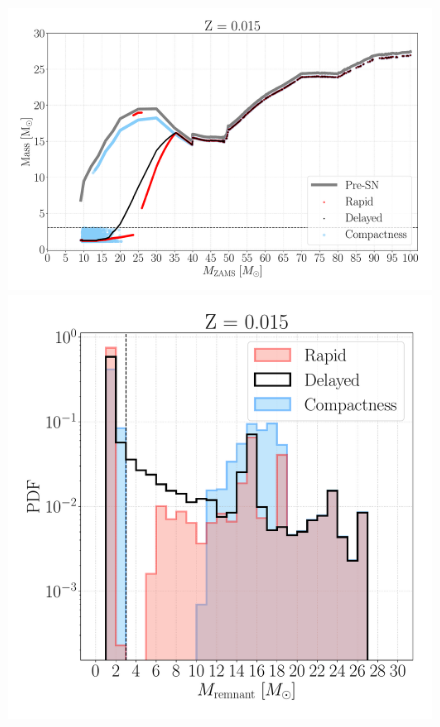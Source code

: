 \documentclass[a4paper,titlepage]{book}     	%
\begin{document}
\begin{figure}[t!]
\begin{minipage}{.39\textwidth}
	\end{minipage}
	\vfill
	\begin{minipage}{.60\textwidth}
		\centering
		\includegraphics[width=1.05\textwidth]{./images/remnants_Z015.pdf}
	\end{minipage}
	\hfill
	\begin{minipage}{.40\textwidth}
		\centering
		\includegraphics[width=1.05\textwidth]{./images/hist_Z015.pdf}	
	\end{minipage}

\end{figure}
\end{document}
